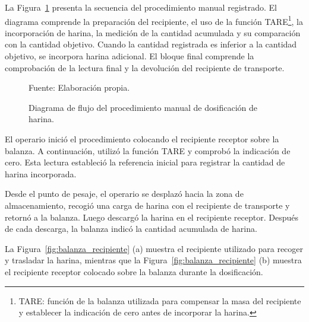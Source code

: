 La Figura~\ref{fig:dfd_dosificacion} presenta la secuencia del procedimiento
manual registrado. El diagrama comprende la preparación del recipiente,
el uso de la función TARE\footnote{TARE: función de la balanza utilizada
para compensar la masa del recipiente y establecer la indicación de cero
antes de incorporar la harina.}, la incorporación de harina, la medición
de la cantidad acumulada y su comparación con la cantidad objetivo. Cuando la cantidad registrada es
inferior a la cantidad objetivo, se incorpora harina adicional. El bloque
final comprende la comprobación de la lectura final y la devolución del
recipiente de transporte.

\begin{figure}[H]
    \centering
    \resizebox{0.6\textwidth}{!}{%
        {\setlength{\fboxsep}{14pt}
        \fbox{}}%
    }
    \caption{Diagrama de flujo del procedimiento manual de dosificación de harina.}
    \label{fig:dfd_dosificacion}
    \vspace{0.2em}
    {\footnotesize Fuente: Elaboración propia.}
\end{figure}

El operario inició el procedimiento colocando el recipiente receptor sobre
la balanza. A continuación, utilizó la función TARE y comprobó la indicación de cero. Esta lectura estableció la referencia
inicial para registrar la cantidad de harina incorporada.

Desde el punto de pesaje, el operario se desplazó hacia la zona de
almacenamiento, recogió una carga de harina con el recipiente de transporte
y retornó a la balanza. Luego descargó la harina en el recipiente receptor.
Después de cada descarga, la balanza indicó la cantidad acumulada de harina.

La Figura~\ref{fig:balanza_recipiente} (a) muestra el recipiente utilizado
para recoger y trasladar la harina, mientras que la
Figura~\ref{fig:balanza_recipiente} (b) muestra el recipiente receptor
colocado sobre la balanza durante la dosificación.

